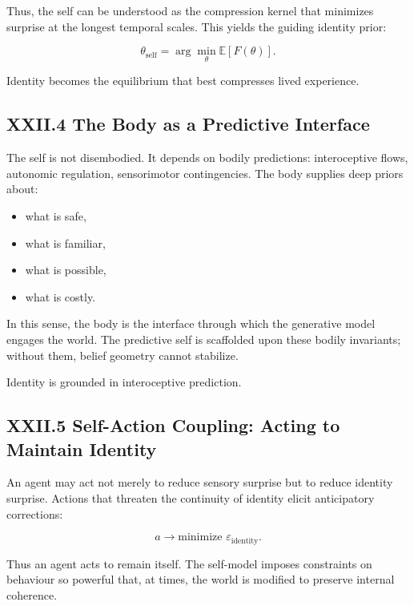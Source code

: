 \documentclass[11pt,letterpaper]{article}
\begin{document}
Thus, the self can be understood as the compression kernel that minimizes surprise at the longest temporal scales.  
This yields the guiding identity prior:

\[
\theta_{\text{self}} = \arg\min_{\theta} \mathbb{E}[F(\theta)].
\]

Identity becomes the equilibrium that best compresses lived experience.

\subsection{XXII.4 The Body as a Predictive Interface}

The self is not disembodied. It depends on bodily predictions: interoceptive flows, autonomic regulation, sensorimotor contingencies.  
The body supplies deep priors about:

\begin{itemize}
    \item what is safe,
    \item what is familiar,
    \item what is possible,
    \item what is costly.
\end{itemize}

In this sense, the body is the interface through which the generative model engages the world.  
The predictive self is scaffolded upon these bodily invariants; without them, belief geometry cannot stabilize.

Identity is grounded in interoceptive prediction.

\subsection{XXII.5 Self-Action Coupling: Acting to Maintain Identity}

An agent may act not merely to reduce sensory surprise but to reduce identity surprise.  
Actions that threaten the continuity of identity elicit anticipatory corrections:

\[
a \to \text{minimize } \varepsilon_{\text{identity}}.
\]

Thus an agent acts to remain itself.  
The self-model imposes constraints on behaviour so powerful that, at times, the world is modified to preserve internal coherence.  
\end{document}
